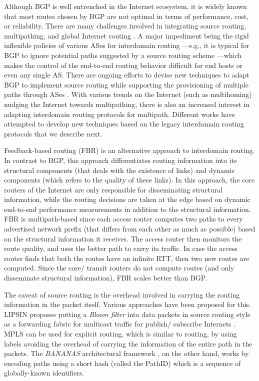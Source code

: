 \documentclass[10pt]{IEEEtran}
\begin{document}
Although BGP is well entrenched in the Internet ecosystem, it is widely known that most routes chosen by BGP are not optimal in terms of performance, cost, or reliability. There are many challenges involved in integrating source routing, multipathing, and global Internet routing \cite{he2008toward}. A major impediment being the rigid inflexible policies of various ASes for interdomain routing \cite{he2008toward}---e.g., it is typical for BGP to ignore potential paths suggested by a source routing scheme \cite{he2008toward}---which makes the control of the end-to-end routing behavior difficult for end hosts or even any single AS. There are ongoing efforts to devise new techniques to adapt BGP to implement source routing while supporting the provisioning of multiple paths through ASes \cite{kushman2007r, wang2009path, van2009loop}. With various trends on the Internet (such as multihoming) nudging the Internet towards multipathing, there is also an increased interest in adapting interdomain routing protocols for multipath. Different works have attempted to develop new techniques based on the legacy interdomain routing protocols that we describe next. 

Feedback-based routing (FBR) \cite{zhu2003feedback} is an alternative approach to interdomain routing. In contrast to BGP, this approach differentiates routing information into its structural components (that deals with the existence of links) and dynamic components (which refers to the quality of these links). In this approach, the core routers of the Internet are only responsible for disseminating structural information, while the routing decisions are taken at the edge based on dynamic end-to-end performance measurements in addition to the structural information. FBR is multipath-based since each access router computes two paths to every advertised network prefix (that differs from each other as much as possible)  based on the structural information it receives. The access router then monitors the route quality, and uses the better path to carry its traffic. In case the access router finds that both the routes have an infinite RTT, then two new routes are computed. Since the core/ transit routers  do not compute routes (and only disseminate structural information), FBR scales better than BGP.

The caveat of source routing is the overhead involved in carrying the routing information in the packet itself. Various approaches have been proposed for this. LIPSIN proposes putting a \textit{Bloom filter} into data packets in source routing style as a forwarding fabric for multicast traffic for publish/ subscribe Internets \cite{jokela2009lipsin}. MPLS can be used for explicit routing, which is similar to routing, by using labels avoiding the overhead of carrying the information of the entire path in the packets. The \textit{BANANAS} architectural framework \cite{kaur2003bananas}, on the other hand, works by encoding paths using a short hash (called the PathID) which is a sequence of globally-known identifiers. 
\end{document}
